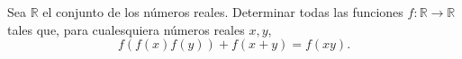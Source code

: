 Sea $\mathbb{R}$ el conjunto de los números reales. Determinar todas las funciones $f : \mathbb{R} \to \mathbb{R}$
tales que, para cualesquiera números reales $x, y$,
\[f(f(x)f(y))+f(x+y)=f(xy).\]
